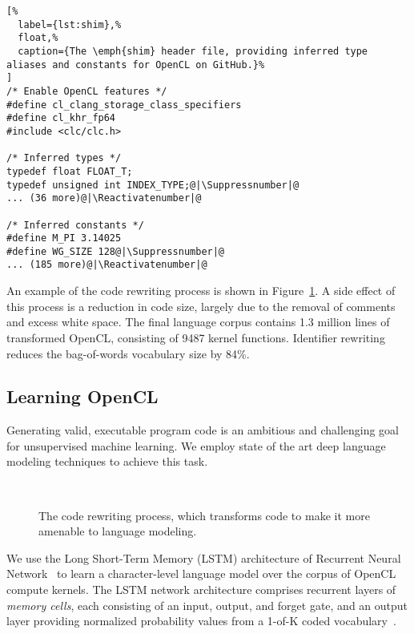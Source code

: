 \lstset{language=C}
\begin{lstlisting}[%
  label={lst:shim},%
  float,%
  caption={The \emph{shim} header file, providing inferred type aliases and constants for OpenCL on GitHub.}%
]
/* Enable OpenCL features */
#define cl_clang_storage_class_specifiers
#define cl_khr_fp64
#include <clc/clc.h>

/* Inferred types */
typedef float FLOAT_T;
typedef unsigned int INDEX_TYPE;@|\Suppressnumber|@
... (36 more)@|\Reactivatenumber|@

/* Inferred constants */
#define M_PI 3.14025
#define WG_SIZE 128@|\Suppressnumber|@
... (185 more)@|\Reactivatenumber|@
\end{lstlisting}

\noindent %
An example of the code rewriting process is shown in Figure~\ref{lst:norm}. A side effect of this process is a reduction in code size, largely due to the removal of comments and excess white space. The final language corpus contains 1.3 million lines of transformed OpenCL, consisting of 9487 kernel functions. Identifier rewriting reduces the bag-of-words vocabulary size by 84\%.

\subsection{Learning OpenCL}\label{sec:ml}

Generating valid, executable program code is an ambitious and challenging goal for unsupervised machine learning. We employ state of the art deep language modeling techniques to achieve this task.

\begin{figure}
  \centering%
  \\%
  \caption{The code rewriting process, which transforms code to make it more amenable to language modeling.}%
  \label{lst:norm}%
\end{figure}

We use the Long Short-Term Memory (LSTM) architecture of Recurrent Neural Network~\cite{Sundermeyer2012,Mikolov2015} to learn a character-level language model over the corpus of OpenCL compute kernels. The LSTM network architecture comprises recurrent layers of \emph{memory cells}, each consisting of an input, output, and forget gate, and an output layer providing normalized probability values from a 1-of-K coded vocabulary~\cite{Graves}.

